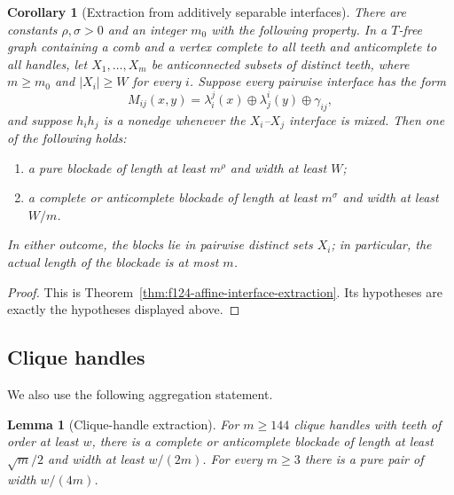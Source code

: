 \documentclass[11pt]{article}
\numberwithin{equation}{section}
\theoremstyle{plain}
\newtheorem{lemma}[theorem]{Lemma}
\newtheorem{corollary}[theorem]{Corollary}
\theoremstyle{definition}
\begin{document}
\begin{corollary}[Extraction from additively separable interfaces]
\label{cor:pivot-affine-extraction}
There are constants $\rho,\sigma>0$ and an integer $m_0$ with the
following property.  In a $T$-free graph containing a comb and a vertex
complete to all teeth and anticomplete to all handles, let
$X_1,\ldots,X_m$ be anticonnected subsets of distinct
teeth, where $m\geq m_0$ and $|X_i|\geq W$ for every $i$.  Suppose
every pairwise interface has the form
\[
 M_{ij}(x,y)=\lambda_i^j(x)\oplus\lambda_j^i(y)
                         \oplus\gamma_{ij},
\]
and suppose $h_ih_j$ is a nonedge whenever the $X_i$--$X_j$ interface
is mixed.  Then one of the following holds:
\begin{enumerate}
 \item a pure blockade of length at least $m^\rho$ and width at least
       $W$;
 \item a complete or anticomplete blockade of length at least
       $m^\sigma$ and width at least $W/m$.
\end{enumerate}
In either outcome, the blocks lie in pairwise distinct sets $X_i$; in
particular, the actual length of the blockade is at most $m$.
\end{corollary}

\begin{proof}
This is Theorem~\ref{thm:f124-affine-interface-extraction}.  Its
hypotheses are exactly the hypotheses displayed above.
\end{proof}

\subsection{Clique handles}

We also use the following aggregation statement.

\begin{lemma}[Clique-handle extraction]
\label{lem:pivot-clique-extraction}
For $m\geq144$ clique handles with teeth of order at least $w$, there
is a complete or anticomplete blockade of length at least $\sqrt m/2$
and width at least $w/(2m)$.  For every $m\geq3$ there is a
pure pair of width $w/(4m)$.
\end{lemma}
\end{document}
